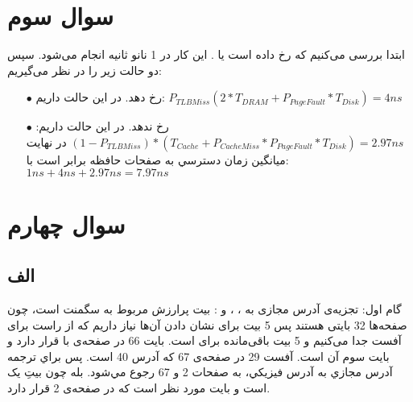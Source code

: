 \documentclass{article}
\begin{document}
\section{سوال سوم}
ابتدا بررسی می‌کنیم که  رخ داده است یا . این کار در 1 نانو ثانیه انجام می‌شود. سپس دو حالت زیر را در نظر می‌گیریم:
\begin{itemize}
    \item [$\bullet$]  رخ دهد. در این حالت داریم:
$
P_{TLBMiss}(2*T_{DRAM}+P_{PageFault}*T_{Disk})=4ns
$
    \item [$\bullet$]  رخ ندهد. در این حالت داریم:
$
(1-P_{TLBMiss})*(T_{Cache}+P_{CacheMiss}*P_{PageFault}*T_{Disk})=2.97ns
$
در نهایت ميانگين زمان دسترسي به صفحات حافظه برابر است با:
$
1ns+4ns+2.97ns=7.97ns
$
\end{itemize}
\section{سوال چهارم}
\subsection{الف}
گام اول: تجزیه‌ی آدرس مجازی به ، ، و :
 بیت پرارزش مربوط به سگمنت است، چون صفحه‌ها 32 بایتی هستند پس 5 بیت برای نشان دادن آن‌ها نیاز داریم که از راست برای آفست جدا می‌کنیم و 5 بیت باقی‌مانده برای  است.
\newline
{}
\newline
{}
\newline
{}
\newline
{}
\newline
\newline
{}
\newline
بایت 66 در صفحه‌ی با  قرار دارد و بایت سوم آن است.
\newline
{}
\newline
{}
\newline
{}
\newline
{}
\newline
آفست 29 در صفحه‌ی 67 که آدرس 40 است. پس براي ترجمه آدرس مجازي به آدرس فيزيكي، به صفحات 2 و 67 رجوع مي‌شود.
\newline
بله چون بیتِ  یک است و بایت مورد نظر  است که در صفحه‌ی 2 قرار دارد.
\end{document}
